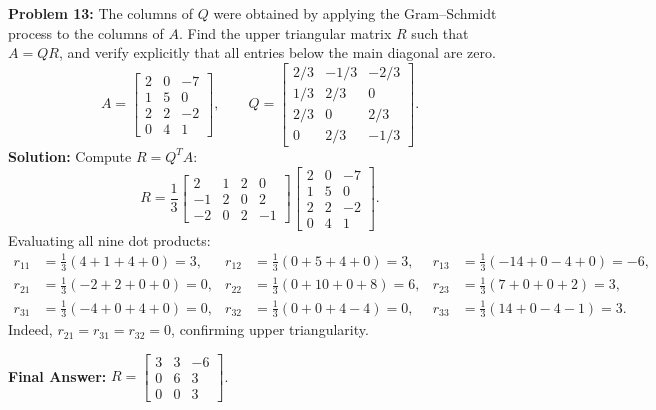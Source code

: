 \documentclass[11pt, letterpaper]{article}
\theoremstyle{definition}
\theoremstyle{remark}
\begin{document}
\textbf{Problem 13:} The columns of $Q$ were obtained by applying the Gram--Schmidt process to the columns of $A$. Find the upper triangular matrix $R$ such that $A = QR$, and verify explicitly that all entries below the main diagonal are zero.
\[
    A = \begin{bmatrix}
        2 & 0 & -7 \\
        1 & 5 & 0 \\
        2 & 2 & -2 \\
        0 & 4 & 1
    \end{bmatrix}, \qquad
    Q = \begin{bmatrix}
        2/3 & -1/3 & -2/3 \\
        1/3 & 2/3 & 0 \\
        2/3 & 0 & 2/3 \\
        0 & 2/3 & -1/3
    \end{bmatrix}.
\]
\textbf{Solution:} Compute $R = Q^T A$:
\[
    R = \frac{1}{3}
    \begin{bmatrix}
        2 & 1 & 2 & 0 \\
        -1 & 2 & 0 & 2 \\
        -2 & 0 & 2 & -1
    \end{bmatrix}
    \begin{bmatrix}
        2 & 0 & -7 \\
        1 & 5 & 0 \\
        2 & 2 & -2 \\
        0 & 4 & 1
    \end{bmatrix}.
\]
Evaluating all nine dot products:
\begin{align*}
    r_{11} &= \frac{1}{3}(4 + 1 + 4 + 0) = 3, & r_{12} &= \frac{1}{3}(0 + 5 + 4 + 0) = 3, & r_{13} &= \frac{1}{3}(-14 + 0 - 4 + 0) = -6, \\
    r_{21} &= \frac{1}{3}(-2 + 2 + 0 + 0) = 0, & r_{22} &= \frac{1}{3}(0 + 10 + 0 + 8) = 6, & r_{23} &= \frac{1}{3}(7 + 0 + 0 + 2) = 3, \\
    r_{31} &= \frac{1}{3}(-4 + 0 + 4 + 0) = 0, & r_{32} &= \frac{1}{3}(0 + 0 + 4 - 4) = 0, & r_{33} &= \frac{1}{3}(14 + 0 - 4 - 1) = 3.
\end{align*}
Indeed, $r_{21} = r_{31} = r_{32} = 0$, confirming upper triangularity.

\textbf{Final Answer:} $R = \begin{bmatrix} 3 & 3 & -6 \\ 0 & 6 & 3 \\ 0 & 0 & 3 \end{bmatrix}$.
\end{document}
